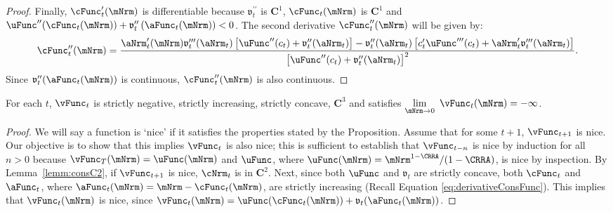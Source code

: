 \documentclass[\econtexRoot/BufferStockTheory]{subfiles}
\begin{document}
\begin{proof}
Finally, $\cFunc_{t}^{\prime }(\mNrm)$ is differentiable because
$\mathfrak{v}_{t}^{\prime \prime }$ is $\mathbf{C}^{1}$, $ \cFunc_{t}(\mNrm)$
is $\mathbf{C}^{1}$ and $\uFunc^{\prime \prime
}(\cFunc_{t}(\mNrm))+\mathfrak{v}_{t}^{\prime \prime }\left( {\aFunc}_{t}(\mNrm)\right)
<0$. The second derivative $\cFunc_{t}^{\prime \prime }(\mNrm)$ will be given by:
%
%
%
\begin{equation}
  \cFunc_{t}^{\prime \prime }(\mNrm)=\frac{{\aNrm}_{t}^{\prime }(\mNrm)\mathfrak{v}_{t}^{\prime \prime
      \prime }({\aNrm}_{t})\left[ \uFunc^{\prime \prime }(c_{t})+\mathfrak{v}_{t}^{\prime \prime }({\aNrm}_{t})
    \right] -\mathfrak{v}_{t}^{\prime \prime }({\aNrm}_{t})\left[ c_{t}^{\prime }\uFunc^{\prime \prime
        \prime }(c_{t})+{\aNrm}_{t}^{\prime }\mathfrak{v}_{t}^{\prime \prime \prime }({\aNrm}_{t})\right] }{
    {\left[ \uFunc^{\prime \prime }(c_{t})+\mathfrak{v}_{t}^{\prime \prime }({\aNrm}_{t})\right]}^{2}}.
\end{equation}
Since $\mathfrak{v}_{t}^{\prime \prime }({\aFunc}_{t}(\mNrm))$ is continuous,
$\cFunc_{t}^{\prime \prime }(\mNrm)$ is also continuous.
%
%

\end{proof}


\begin{proposition}\label{prop:vfc3}
For each $t$, $\vFunc_{t}$ is strictly negative, strictly increasing, strictly concave, $\mathbf{C}^{3}$ and satisfies $\lim\limits_{\mNrm\rightarrow 0}~\vFunc_{t}(\mNrm) =-\infty $.
\end{proposition}

\begin{proof}

We will say a function is `nice' if it satisfies the properties stated by the Proposition. Assume that for some $t+1$, $\vFunc_{t+1}$ is nice.  Our objective is to show that this
implies $\vFunc_{t}$ is also nice; this is sufficient to establish that
$\vFunc_{t-n}$ is nice by induction for all $n > 0$ because $\vFunc_{T}(\mNrm)
=\uFunc(\mNrm) $ and $\uFunc$, where $\uFunc(\mNrm)=\mNrm^{1-\CRRA}/(1-\CRRA)$, is nice by inspection. By Lemma~\ref{lemm:consC2}, if $\vFunc_{t+1}$ is nice, $\cNrm_{t}$ is in $\mathbf{C}^{2}$. Next, since both $\uFunc$ and $\mathfrak{v}_{t}$ are strictly concave, both
$\cFunc_{t}$ and $\aFunc_{t}$, where $\aFunc_{t}(\mNrm)=\mNrm-\cFunc_{t}(\mNrm)$,
are strictly increasing (Recall Equation \eqref{eq:derivativeConsFunc}).  This implies that
$\vFunc_{t}(\mNrm)$ is nice, since
$\vFunc_{t}(\mNrm)=\uFunc(\cFunc_{t}(\mNrm))+\mathfrak{v}_{t}({\aFunc}_{t}(\mNrm))$.
\end{proof}
\end{document}
